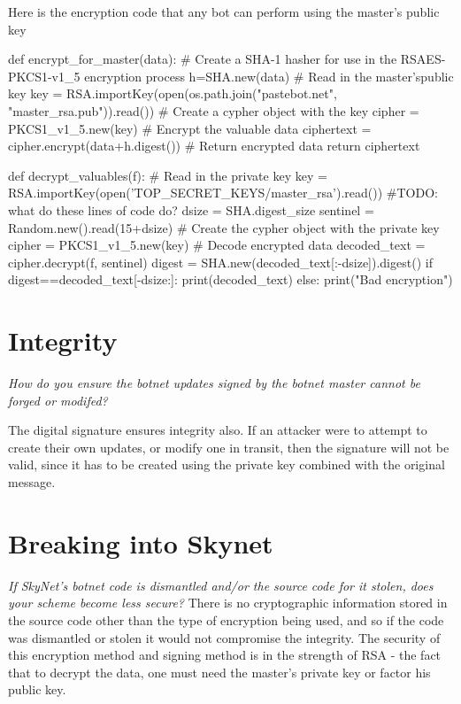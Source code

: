 \documentclass[9pt,a4paper]{article}
\begin{document}
Here is the encryption code that any bot can perform using the master's public key
\begin{center}
\vspace{-2ex}
\begin{python}
def encrypt_for_master(data):
    # Create a SHA-1 hasher for use in the RSAES-PKCS1-v1_5 encryption process
    h=SHA.new(data)
    # Read in the master'spublic key
    key = RSA.importKey(open(os.path.join("pastebot.net", "master_rsa.pub")).read())
    # Create a cypher object with the key
    cipher = PKCS1_v1_5.new(key)
    # Encrypt the valuable data
    ciphertext = cipher.encrypt(data+h.digest())
    # Return encrypted data
    return ciphertext
\end{python}
\end{center}

\begin{center}
\vspace{-2ex}
\begin{python}
def decrypt_valuables(f):
    # Read in the private key
    key = RSA.importKey(open('TOP_SECRET_KEYS/master_rsa').read())
    #TODO: what do these lines of code do?
    dsize = SHA.digest_size
    sentinel = Random.new().read(15+dsize)
    # Create the cypher object with the private key
    cipher = PKCS1_v1_5.new(key)
    # Decode encrypted data
    decoded_text = cipher.decrypt(f, sentinel)
    digest = SHA.new(decoded_text[:-dsize]).digest()
    if digest==decoded_text[-dsize:]:
        print(decoded_text)
    else:
        print("Bad encryption")
\end{python}
\end{center}


\section{Integrity}

\emph{ How do you ensure the botnet updates signed by the botnet master cannot be forged or modifed?}

The digital signature ensures integrity also. If an attacker were to attempt to create their own updates, or modify one in transit, then the signature will not be valid, since it has to be created using the private key combined with the original message.

\section{Breaking into Skynet}
\emph{If SkyNet's botnet code is dismantled and/or the source code for it stolen, does your scheme become less secure?}
There is no cryptographic information stored in the source code other than the type of encryption being used, and so if the code was dismantled or stolen it would not compromise the integrity. The security of this encryption method and signing method is in the strength of RSA - the fact that to decrypt the data, one must need the master's private key or factor his public key.
\end{document}
